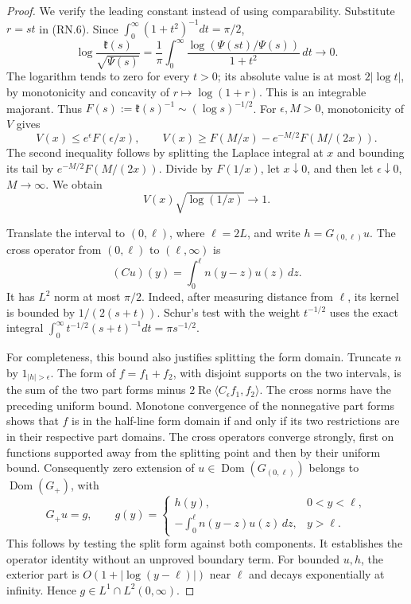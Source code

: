 \begin{proof}
We verify the leading constant instead of using comparability.
Substitute \(r=st\) in (RN.6).  Since
\(\int_0^\infty(1+t^2)^{-1}dt=\pi/2\),
\[
 \log\frac{\mathfrak k(s)}{\sqrt{\Psi(s)}}
   =\frac1\pi\int_0^\infty
       \frac{\log(\Psi(st)/\Psi(s))}{1+t^2}\,dt\longrightarrow0.
                                                        \tag{RN.9}
\]
The logarithm tends to zero for every \(t>0\); its absolute value
is at most \(2|\log t|\), by monotonicity and concavity of
\(r\mapsto\log(1+r)\).  This is an integrable majorant.
Thus \(F(s):=\mathfrak k(s)^{-1}\sim(\log s)^{-1/2}\).
For \(\epsilon,M>0\), monotonicity of \(V\) gives
\[
 V(x)\leq e^\epsilon F(\epsilon/x),\qquad
 V(x)\geq F(M/x)-e^{-M/2}F(M/(2x)).
                                                        \tag{RN.10}
\]
The second inequality follows by splitting the Laplace integral
at \(x\) and bounding its tail by
\(e^{-M/2}F(M/(2x))\).
Divide by \(F(1/x)\), let \(x\downarrow0\), and then let
\(\epsilon\downarrow0\), \(M\to\infty\).  We obtain
\[
                        V(x)\sqrt{\log(1/x)}\longrightarrow1.
                                                        \tag{RN.11}
\]

Translate the interval to \((0,\ell)\), where \(\ell=2L\),
and write \(h=G_{(0,\ell)}u\).  The cross operator from
\((0,\ell)\) to \((\ell,\infty)\) is
\[
 (Cu)(y)=\int_0^\ell n(y-z)u(z)\,dz.
\]
It has \(L^2\) norm at most \(\pi/2\).
Indeed, after measuring distance from \(\ell\), its kernel is
bounded by \(1/(2(s+t))\).  Schur's test with the weight
\(t^{-1/2}\) uses the exact integral
\(\int_0^\infty t^{-1/2}(s+t)^{-1}dt=\pi s^{-1/2}\).

For completeness, this bound also justifies splitting the form
domain.  Truncate \(n\) by \(1_{|h|>\epsilon}\).
The form of \(f=f_1+f_2\), with disjoint supports on the two
intervals, is the sum of the two part forms minus
\(2\operatorname{Re}\langle C_\epsilon f_1,f_2\rangle\).
The cross norms have the preceding uniform bound.
Monotone convergence of the nonnegative part forms shows that
\(f\) is in the half-line form domain if and only if its two
restrictions are in their respective part domains.
The cross operators converge strongly, first on functions supported
away from the splitting point and then by their uniform bound.
Consequently zero extension of \(u\in\operatorname{Dom}(G_{(0,\ell)})\)
belongs to \(\operatorname{Dom}(G_+)\), with
\[
 G_+u=g,\qquad
 g(y)=\begin{cases}
 h(y),&0<y<\ell,\\
 -\displaystyle\int_0^\ell n(y-z)u(z)\,dz,&y>\ell.
 \end{cases}
                                                        \tag{RN.12}
\]
This follows by testing the split form against both components.
It establishes the operator identity without an unproved boundary
term.  For bounded \(u,h\), the exterior part is
\(O(1+|\log(y-\ell)|)\) near \(\ell\) and decays exponentially
at infinity.  Hence \(g\in L^1\cap L^2(0,\infty)\).


\end{proof}
